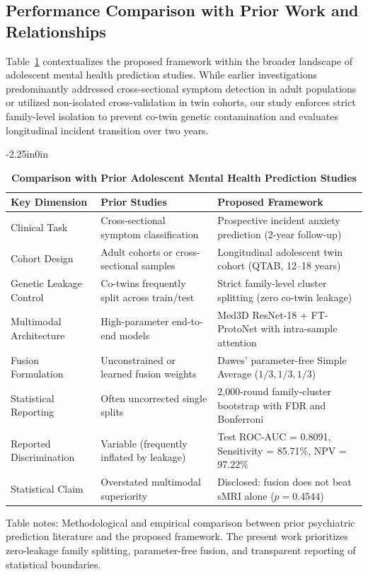 \documentclass[10pt,letterpaper]{article}
\begin{document}
\subsection*{Performance Comparison with Prior Work and Relationships}

Table~\ref{tab:prior_comparison} contextualizes the proposed framework within the broader landscape of adolescent mental health prediction studies. While earlier investigations predominantly addressed cross-sectional symptom detection in adult populations or utilized non-isolated cross-validation in twin cohorts, our study enforces strict family-level isolation to prevent co-twin genetic contamination and evaluates longitudinal incident transition over two years.

\begin{table}[!t]
\begin{adjustwidth}{-2.25in}{0in}
\centering
\caption{\textbf{Comparison with Prior Adolescent Mental Health Prediction Studies}}
\label{tab:prior_comparison}
\footnotesize
\renewcommand{\arraystretch}{1.15}
\begin{tabular}{|p{4.5cm}|p{5.5cm}|p{6.0cm}|}
\hline
\textbf{Key Dimension} & \textbf{Prior Studies} & \textbf{Proposed Framework} \\
\hline
Clinical Task & Cross-sectional symptom classification & Prospective incident anxiety prediction (2-year follow-up) \\
\hline
Cohort Design & Adult cohorts or cross-sectional samples & Longitudinal adolescent twin cohort (QTAB, 12--18 years) \\
\hline
Genetic Leakage Control & Co-twins frequently split across train/test & Strict family-level cluster splitting (zero co-twin leakage) \\
\hline
Multimodal Architecture & High-parameter end-to-end models & Med3D ResNet-18 + FT-ProtoNet with intra-sample attention \\
\hline
Fusion Formulation & Unconstrained or learned fusion weights & Dawes' parameter-free Simple Average ($1/3, 1/3, 1/3$) \\
\hline
Statistical Reporting & Often uncorrected single splits & 2,000-round family-cluster bootstrap with FDR and Bonferroni \\
\hline
Reported Discrimination & Variable (frequently inflated by leakage) & Test ROC-AUC = 0.8091, Sensitivity = 85.71\%, NPV = 97.22\% \\
\hline
Statistical Claim & Overstated multimodal superiority & Disclosed: fusion does not beat sMRI alone ($p = 0.4544$) \\
\hline
\end{tabular}
\begin{flushleft}
Table notes: Methodological and empirical comparison between prior psychiatric prediction literature and the proposed framework. The present work prioritizes zero-leakage family splitting, parameter-free fusion, and transparent reporting of statistical boundaries.
\end{flushleft}
\end{adjustwidth}
\end{table}
\end{document}
